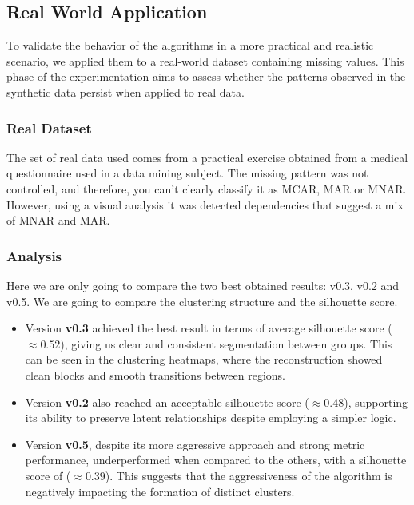 \documentclass[a4paper,12pt]{article}
\begin{document}
\subsection{Real World Application}
To validate the behavior of the algorithms in a more practical and realistic scenario, we applied them to a real-world dataset containing missing values. This phase of the experimentation aims to assess whether the patterns observed in the synthetic data persist when applied to real data.

\subsubsection{Real Dataset}
The set of real data used comes from a practical exercise obtained from a medical questionnaire used in a data mining subject. The missing pattern was not controlled, and therefore, you can't clearly classify it as MCAR, MAR or MNAR. However, using a visual analysis it was detected dependencies that suggest a mix of MNAR and MAR. 

\subsubsection{Analysis}
Here we are only going to compare the two best obtained results: v0.3, v0.2 and v0.5. We are going to compare the clustering structure and the silhouette score.
\begin{itemize}
    \item Version \textbf{v0.3} achieved the best result in terms of average silhouette score ($\approx 0.52$), giving us clear and consistent segmentation between groups. This can be seen in the clustering heatmaps, where the reconstruction showed clean blocks and smooth transitions between regions.
    \item Version \textbf{v0.2} also reached an acceptable silhouette score ($\approx 0.48$), supporting its ability to preserve latent relationships despite employing a simpler logic.
    \item Version \textbf{v0.5}, despite its more aggressive approach and strong metric performance, underperformed when compared to the others, with a silhouette score of ($\approx 0.39$). This suggests that the aggressiveness of the algorithm is negatively impacting the formation of distinct clusters.
\end{itemize}
\end{document}
